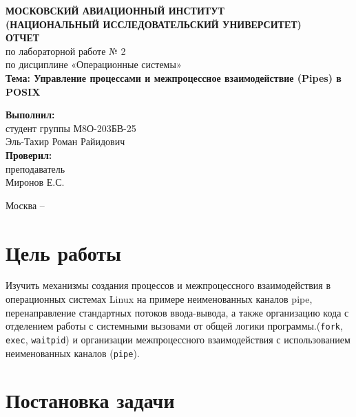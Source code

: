 \documentclass[11pt, a4paper]{article}
\begin{document}
\begin{titlepage}
    \centering
    \vspace*{2cm}
    
    {\large \textbf{МОСКОВСКИЙ АВИАЦИОННЫЙ ИНСТИТУТ}} \\[0.5cm]
    {\large \textbf{(НАЦИОНАЛЬНЫЙ ИССЛЕДОВАТЕЛЬСКИЙ УНИВЕРСИТЕТ)}} \\[2cm]
    
    {\Large \textbf{ОТЧЕТ}} \\
    {\large по лабораторной работе № 2} \\
    {\large по дисциплине «Операционные системы»} \\[1.5cm]
    
    {\Large \textbf{Тема: Управление процессами и межпроцессное взаимодействие (Pipes) в POSIX}} \\[3cm]
    
    \begin{flushright}
        \textbf{Выполнил:} \\
        студент группы М8О-203БВ-25 \\
        Эль-Тахир Роман Райидович \\[1cm]
        
        \textbf{Проверил:} \\
        преподаватель \\
        Миронов Е.С.
    \end{flushright}
    
    \vfill
    {\large Москва -- \the\year}
\end{titlepage}

\newpage

\section{Цель работы}
Изучить механизмы создания процессов и межпроцессного взаимодействия в операционных системах Linux на примере неименованных каналов pipe, перенаправление стандартных потоков ввода-вывода,
а также организацию кода с отделением работы с системными вызовами от общей логики программы.(\texttt{fork}, \texttt{exec}, \texttt{waitpid}) и организации межпроцессного взаимодействия с использованием неименованных каналов (\texttt{pipe}).

\section{Постановка задачи}
\end{document}
